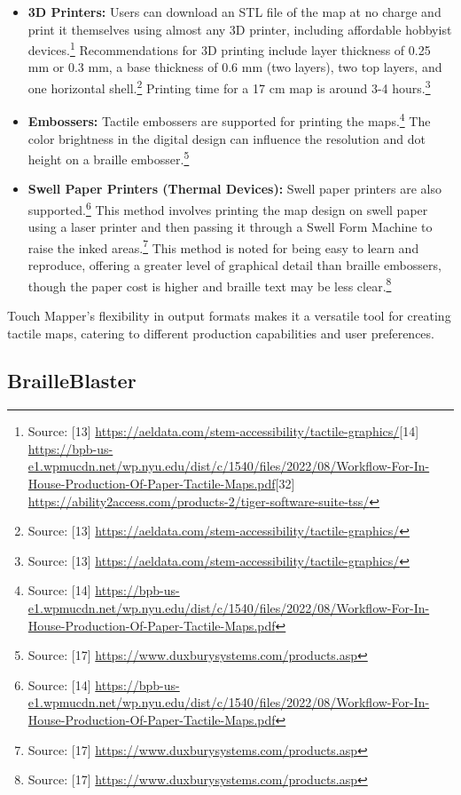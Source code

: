\begin{itemize}
    \item \textbf{3D Printers:} Users can download an STL file of the map at no charge and print it themselves using almost any 3D printer, including affordable hobbyist devices.\footnote{Source: [13] \url{https://aeldata.com/stem-accessibility/tactile-graphics/}[14] \url{https://bpb-us-e1.wpmucdn.net/wp.nyu.edu/dist/c/1540/files/2022/08/Workflow-For-In-House-Production-Of-Paper-Tactile-Maps.pdf}[32] \url{https://ability2access.com/products-2/tiger-software-suite-tss/}} Recommendations for 3D printing include layer thickness of 0.25 mm or 0.3 mm, a base thickness of 0.6 mm (two layers), two top layers, and one horizontal shell.\footnote{Source: [13] \url{https://aeldata.com/stem-accessibility/tactile-graphics/}} Printing time for a 17 cm map is around 3-4 hours.\footnote{Source: [13] \url{https://aeldata.com/stem-accessibility/tactile-graphics/}}
    \item \textbf{Embossers:} Tactile embossers are supported for printing the maps.\footnote{Source: [14] \url{https://bpb-us-e1.wpmucdn.net/wp.nyu.edu/dist/c/1540/files/2022/08/Workflow-For-In-House-Production-Of-Paper-Tactile-Maps.pdf}} The color brightness in the digital design can influence the resolution and dot height on a braille embosser.\footnote{Source: [17] \url{https://www.duxburysystems.com/products.asp}}
    \item \textbf{Swell Paper Printers (Thermal Devices):} Swell paper printers are also supported.\footnote{Source: [14] \url{https://bpb-us-e1.wpmucdn.net/wp.nyu.edu/dist/c/1540/files/2022/08/Workflow-For-In-House-Production-Of-Paper-Tactile-Maps.pdf}} This method involves printing the map design on swell paper using a laser printer and then passing it through a Swell Form Machine to raise the inked areas.\footnote{Source: [17] \url{https://www.duxburysystems.com/products.asp}} This method is noted for being easy to learn and reproduce, offering a greater level of graphical detail than braille embossers, though the paper cost is higher and braille text may be less clear.\footnote{Source: [17] \url{https://www.duxburysystems.com/products.asp}}
\end{itemize}

Touch Mapper's flexibility in output formats makes it a versatile tool for creating tactile maps, catering to different production capabilities and user preferences.

\subsection{BrailleBlaster}

